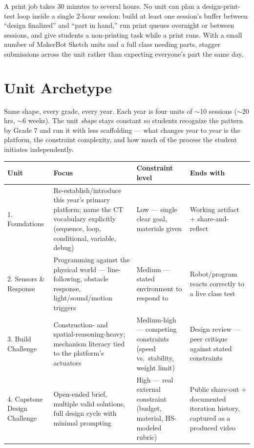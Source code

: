 \documentclass[10pt, a4paper]{article}
\begin{document}
\begin{tcolorbox}[note, title={\small\bfseries\color{accent}Digital fabrication note --- this changes pacing, not just materials}]
A print job takes 30 minutes to several hours. No unit can plan a design-print-test loop inside a single 2-hour session: build at least one session's buffer between ``design finalized'' and ``part in hand,'' run print queues overnight or between sessions, and give students a non-printing task while a print runs. With a small number of MakerBot Sketch units and a full class needing parts, stagger submissions across the unit rather than expecting everyone's part the same day.
\end{tcolorbox}

\section{Unit Archetype}

Same shape, every grade, every year. Each year is four units of $\sim$10 sessions ($\sim$20 hrs, $\sim$6 weeks). The unit \emph{shape} stays constant so students recognize the pattern by Grade 7 and run it with less scaffolding --- what changes year to year is the platform, the constraint complexity, and how much of the process the student initiates independently.

\begin{center}
\small
\begin{tabularx}{\linewidth}{@{}p{2.5cm}Xp{2.3cm}X@{}}
\toprule
\textbf{Unit} & \textbf{Focus} & \textbf{Constraint level} & \textbf{Ends with} \\
\midrule
1. Foundations & Re-establish/introduce this year's primary platform; name the CT vocabulary explicitly (sequence, loop, conditional, variable, debug) & Low --- single clear goal, materials given & Working artifact + share-and-reflect \\
2. Sensors \& Response & Programming against the physical world --- line-following, obstacle response, light/sound/motion triggers & Medium --- stated environment to respond to & Robot/program reacts correctly to a live class test \\
3. Build Challenge & Construction- and spatial-reasoning-heavy; mechanism literacy tied to the platform's actuators & Medium-high --- competing constraints (speed vs.\ stability, weight limit) & Design review --- peer critique against stated constraints \\
4. Capstone Design Challenge & Open-ended brief, multiple valid solutions, full design cycle with minimal prompting & High --- real external constraint (budget, material, HS-modeled rubric) & Public share-out + documented iteration history, captured as a produced video \\
\bottomrule
\end{tabularx}
\end{center}
\end{document}

